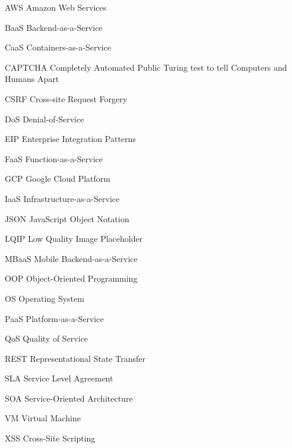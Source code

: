 \documentclass[utf8,english]{gradu3}
\begin{document}
\begin{thetermlist}
\item[AWS] Amazon Web Services
\item[BaaS] Backend-as-a-Service
\item[CaaS] Containers-as-a-Service
\item[CAPTCHA] Completely Automated Public Turing test to tell Computers and Humans Apart
\item[CSRF] Cross-site Request Forgery
\item[DoS] Denial-of-Service
\item[EIP] Enterprise Integration Patterns
\item[FaaS] Function-as-a-Service
\item[GCP] Google Cloud Platform
\item[IaaS] Infrastructure-as-a-Service
\item[JSON] JavaScript Object Notation
\item[LQIP] Low Quality Image Placeholder
\item[MBaaS] Mobile Backend-as-a-Service
\item[OOP] Object-Oriented Programming
\item[OS] Operating System
\item[PaaS] Platform-as-a-Service
\item[QoS] Quality of Service
\item[REST] Representational State Transfer
\item[SLA] Service Level Agreement
\item[SOA] Service-Oriented Architecture
\item[VM] Virtual Machine
\item[XSS] Cross-Site Scripting
\end{thetermlist}

\mainmatter








\printbibliography
\end{document}
